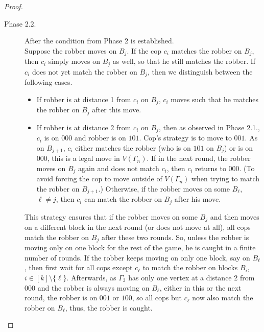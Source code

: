 \documentclass[10pt,a4paper]{amsart}
\begin{document}
\begin{proof}
\begin{description}
\begin{description}
            \item[Phase 2.2.] After the condition from Phase 2 is established.\\
            Suppose the robber moves on $B_j$. If the cop $c_i$ matches the robber on $B_j$, then $c_i$ simply moves on $B_j$ as well, so that he still matches the robber. If $c_i$ does not yet match the robber on $B_j$, then we distinguish between the following cases.
            \begin{itemize}
                \item If robber is at distance 1 from $c_i$ on $B_j$, $c_i$ moves such that he matches the robber on $B_j$ after this move.
                \item If robber is at distance $2$ from $c_i$ on $B_j$, then as observed in Phase 2.1., $c_i$ is on $000$ and robber is on $101$. Cop's strategy is to move to $001$. As on $B_{j+1}$, $c_i$ either matches the robber (who is on $101$ on $B_j$) or is on $000$, this is a legal move in $V(\Gamma_n)$. If in the next round, the robber moves on $B_j$ again and does not match $c_i$, then $c_i$ returns to $000$. (To avoid forcing the cop to move outside of $V(\Gamma_n)$ when trying to match the robber on $B_{j+1}$.) Otherwise, if the robber moves on some $B_\ell$, $\ell \neq j$, then $c_i$ can match the robber on $B_j$ after his move. 
            \end{itemize}
            This strategy ensures that if the robber moves on some $B_j$ and then moves on a different block in the next round (or does not move at all), all cops match the robber on $B_j$ after these two rounds. So, unless the robber is moving only on one block for the rest of the game, he is caught in a finite number of rounds. If the robber keeps moving on only one block, say on $B_\ell$, then first wait for all cops except $c_\ell$ to match the robber on blocks $B_i$, $i \in [k] \setminus \{\ell\}$. Afterwards, as $\Gamma_3$ has only one vertex at a distance 2 from $000$ and the robber is always moving on $B_\ell$, either in this or the next round, the robber is on $001$ or $100$, so all cops but $c_\ell$ now also match the robber on $B_\ell$, thus, the robber is caught. \hfill \qedhere
        \end{description}
    \end{description}
\end{proof}
\end{document}
